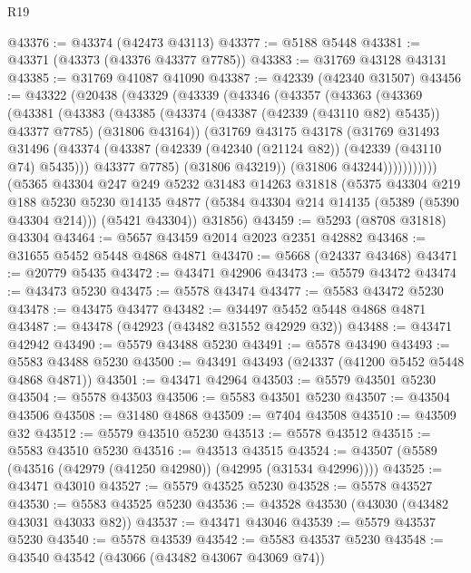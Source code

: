 \begin{lexlean}{R19}
\begin{coremodule}
@43376 := @43374 (@42473 @43113)
@43377 := @5188 @5448
@43381 := @43371 (@43373 (@43376 @43377 @7785))
@43383 := @31769 @43128 @43131
@43385 := @31769 @41087 @41090
@43387 := @42339 (@42340 @31507)
@43456 := @43322
    (@20438
      (@43329
        (@43339
          (@43346
            (@43357
              (@43363
                (@43369
                  (@43381
                    (@43383
                      (@43385
                        (@43374 (@43387 (@42339 (@43110 @82) @5435)) @43377 @7785)
                        (@31806 @43164))
                      (@31769
                        @43175
                        @43178
                        (@31769
                          @31493
                          @31496
                          (@43374
                            (@43387 (@42339 (@42340 (@21124 @82)) (@42339 (@43110 @74) @5435)))
                            @43377
                            @7785)
                          (@31806 @43219))
                        (@31806 @43244)))))))))))
    (@5365
      @43304
      @247
      @249
      @5232
      @31483
      @14263
      @31818
      (@5375
        @43304
        @219
        @188
        @5230
        @5230
        @14135
        @4877
        (@5384 @43304 @214 @14135 (@5389 (@5390 @43304 @214)))
        (@5421 @43304))
      @31856)
@43459 := @5293 (@8708 @31818) @43304
@43464 := @5657 @43459 @2014 @2023 @2351 @42882
@43468 := @31655 @5452 @5448 @4868 @4871
@43470 := @5668 (@24337 @43468)
@43471 := @20779 @5435
@43472 := @43471 @42906
@43473 := @5579 @43472
@43474 := @43473 @5230
@43475 := @5578 @43474
@43477 := @5583 @43472 @5230
@43478 := @43475 @43477
@43482 := @34497 @5452 @5448 @4868 @4871
@43487 := @43478 (@42923 (@43482 @31552 @42929 @32))
@43488 := @43471 @42942
@43490 := @5579 @43488 @5230
@43491 := @5578 @43490
@43493 := @5583 @43488 @5230
@43500 := @43491 @43493 (@24337 (@41200 @5452 @5448 @4868 @4871))
@43501 := @43471 @42964
@43503 := @5579 @43501 @5230
@43504 := @5578 @43503
@43506 := @5583 @43501 @5230
@43507 := @43504 @43506
@43508 := @31480 @4868
@43509 := @7404 @43508
@43510 := @43509 @32
@43512 := @5579 @43510 @5230
@43513 := @5578 @43512
@43515 := @5583 @43510 @5230
@43516 := @43513 @43515
@43524 := @43507 (@5589 (@43516 (@42979 (@41250 @42980)) (@42995 (@31534 @42996))))
@43525 := @43471 @43010
@43527 := @5579 @43525 @5230
@43528 := @5578 @43527
@43530 := @5583 @43525 @5230
@43536 := @43528 @43530 (@43030 (@43482 @43031 @43033 @82))
@43537 := @43471 @43046
@43539 := @5579 @43537 @5230
@43540 := @5578 @43539
@43542 := @5583 @43537 @5230
@43548 := @43540 @43542 (@43066 (@43482 @43067 @43069 @74))

\end{coremodule}
\end{lexlean}
